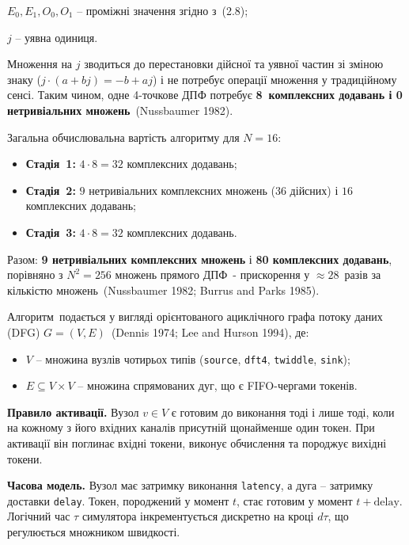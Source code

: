 \documentclass[
]{article}
\begin{document}
\(E_{0},E_{1},O_{0},O_{1}\) -- проміжні значення згідно з~(2.8);

\(j\) -- уявна одиниця.

Множення на \(j\) зводиться до перестановки дійсної та уявної частин зі
зміною знаку (\(j \cdot (a + bj) = - b + aj\)) і не потребує операції
множення у традиційному сенсі. Таким чином, одне 4-точкове ДПФ потребує
\textbf{8~комплексних додавань і 0 нетривіальних множень}~(Nussbaumer
1982).

Загальна обчислювальна вартість алгоритму для \(N = 16\):

\begin{itemize}
\item
  \textbf{Стадія~1:} \(4 \cdot 8 = 32\) комплексних додавань;
\item
  \textbf{Стадія~2:} \(9\) нетривіальних комплексних множень (\(36\)
  дійсних) і \(16\) комплексних додавань;
\item
  \textbf{Стадія~3:} \(4 \cdot 8 = 32\) комплексних додавань.
\end{itemize}

Разом: \textbf{9 нетривіальних комплексних множень} і \textbf{80
комплексних додавань}, порівняно з \(N^{2} = 256\) множень прямого ДПФ~-
прискорення у \(\approx 28\)~разів за кількістю множень~(Nussbaumer
1982; Burrus and Parks 1985).

Алгоритм~подається у вигляді орієнтованого ациклічного графа потоку
даних (DFG) \(G = (V,E)\)~(Dennis 1974; Lee and Hurson 1994), де:

\begin{itemize}
\item
  \(V\) -- множина вузлів чотирьох типів (\texttt{source},
  \texttt{dft4}, \texttt{twiddle}, \texttt{sink});
\item
  \(E \subseteq V \times V\) -- множина спрямованих дуг, що є
  FIFO-чергами токенів.
\end{itemize}

\textbf{Правило активації.} Вузол \(v \in V\) є готовим до виконання
тоді і лише тоді, коли на кожному з його вхідних каналів присутній
щонайменше один токен. При активації він поглинає вхідні токени, виконує
обчислення та породжує вихідні токени.

\textbf{Часова модель.} Вузол має затримку виконання \texttt{latency}, а
дуга -- затримку доставки \texttt{delay}. Токен, породжений у момент
\(t\), стає готовим у момент \(t + \text{delay}\). Логічний час \(\tau\)
симулятора інкрементується дискретно на кроці \(d\tau\), що регулюється
множником швидкості.
\end{document}
